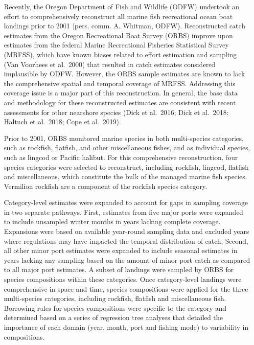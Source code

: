 \documentclass[11pt,
  english,
  a4paper,
]{article}
\begin{document}
\leavevmode\tagmcend\tagstructend


Recently, the Oregon Department of Fish and Wildlife (ODFW) undertook an effort to comprehensively reconstruct all marine fish recreational ocean boat landings prior to 2001 (pers. comm. A. Whitman, ODFW). Reconstructed catch estimates from the Oregon Recreational Boat Survey (ORBS) improve upon estimates from the federal Marine Recreational Fisheries Statistical Survey (MRFSS), which have known biases related to effort estimation and sampling (Van Voorhees et al.~2000) that resulted in catch estimates considered implausible by ODFW. However, the ORBS sample estimates are known to lack the comprehensive spatial and temporal coverage of MRFSS. Addressing this coverage issue is a major part of this reconstruction. In general, the base data and methodology for these reconstructed estimates are consistent with recent assessments for other nearshore species (Dick et al.~2016; Dick et al.~2018; Haltuch et al.~2018; Cope et al.~2019).

\leavevmode\tagmcend\tagstructend\par


Prior to 2001, ORBS monitored marine species in both multi-species categories, such as rockfish, flatfish, and other miscellaneous fishes, and as individual species, such as lingcod or Pacific halibut. For this comprehensive reconstruction, four species categories were selected to reconstruct, including rockfish, lingcod, flatfish and miscellaneous, which constitute the bulk of the managed marine fish species. Vermilion rockfish are a component of the rockfish species category.

\leavevmode\tagmcend\tagstructend\par


Category-level estimates were expanded to account for gaps in sampling coverage in two separate pathways. First, estimates from five major ports were expanded to include unsampled winter months in years lacking complete coverage. Expansions were based on available year-round sampling data and excluded years where regulations may have impacted the temporal distribution of catch. Second, all other minor port estimates were expanded to include seasonal estimates in years lacking any sampling based on the amount of minor port catch as compared to all major port estimates. A subset of landings were sampled by ORBS for species compositions within these categories. Once category-level landings were comprehensive in space and time, species compositions were applied for the three multi-species categories, including rockfish, flatfish and miscellaneous fish. Borrowing rules for species compositions were specific to the category and determined based on a series of regression tree analyses that detailed the importance of each domain (year, month, port and fishing mode) to variability in compositions.
\end{document}
